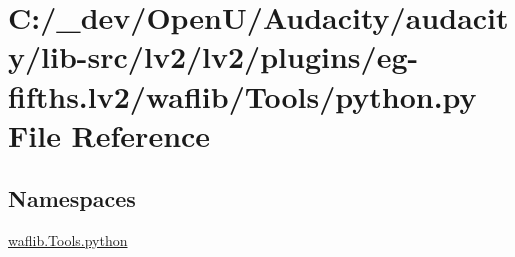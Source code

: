\hypertarget{lv2_2plugins_2eg-fifths_8lv2_2waflib_2_tools_2python_8py}{}\section{C\+:/\+\_\+dev/\+Open\+U/\+Audacity/audacity/lib-\/src/lv2/lv2/plugins/eg-\/fifths.lv2/waflib/\+Tools/python.py File Reference}
\label{lv2_2plugins_2eg-fifths_8lv2_2waflib_2_tools_2python_8py}
\subsection*{Namespaces}
\begin{DoxyCompactItemize}
\item 
 \hyperlink{namespacewaflib_1_1_tools_1_1python}{waflib.\+Tools.\+python}
\end{DoxyCompactItemize}
